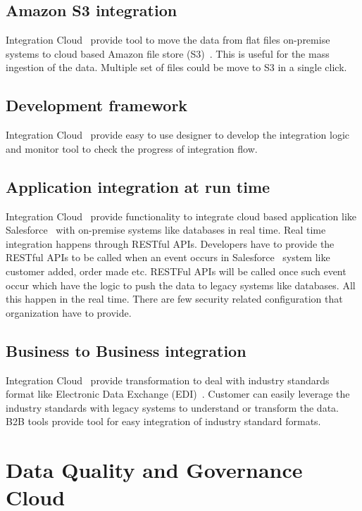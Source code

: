 \subsection{Amazon S3 integration}

Integration Cloud~\cite{hid-sp18-511-iics} provide tool to move the
data from flat files on-premise systems to cloud based Amazon file
store (S3)~\cite{hid-sp18-511-aws-s3}. This is useful for the mass
ingestion of the data. Multiple set of files could be move to S3 in a
single click.

\subsection{Development framework}

Integration Cloud~\cite{hid-sp18-511-iics} provide easy to use
designer to develop the integration logic and monitor tool to check
the progress of integration flow.

\subsection{Application integration at run time}

Integration Cloud~\cite{hid-sp18-511-iics} provide functionality to
integrate cloud based application like
Salesforce~\cite{hid-sp18-511-salesforce} with on-premise systems like
databases in real time. Real time integration happens through RESTful
APIs. Developers have to provide the RESTful APIs to be called when an
event occurs in Salesforce~\cite{hid-sp18-511-salesforce} system like
customer added, order made etc. RESTFul APIs will be called once such
event occur which have the logic to push the data to legacy systems
like databases. All this happen in the real time. There are few
security related configuration that organization have to provide.

\subsection{Business to Business integration}

Integration Cloud~\cite{hid-sp18-511-iics} provide transformation to
deal with industry standards format like Electronic Data Exchange
(EDI)~\cite{hid-sp18-511-edi}. Customer can easily leverage the
industry standards with legacy systems to understand or transform the
data. B2B tools provide tool for easy integration of industry standard
formats.

\section{Data Quality and Governance Cloud}


